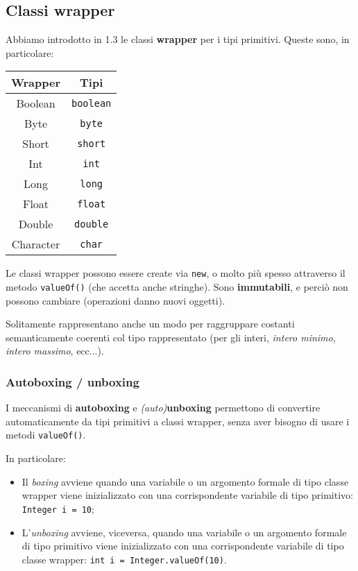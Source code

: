 \documentclass[a4paper,11pt]{article}
\begin{document}
\subsection{Classi wrapper}
Abbiamo introdotto in 1.3 le classi \textbf{wrapper} per i tipi primitivi.
Queste sono, in particolare:
\begin{table}[H]
	\center {}
	\begin{tabular} { c | c }
		\bfseries Wrapper & \bfseries Tipi \\
		\hline
		Boolean & \lstinline|boolean|\\
		Byte & \lstinline|byte|\\
		Short & \lstinline|short|\\
		Int & \lstinline|int|\\
		Long & \lstinline|long|\\
		Float & \lstinline|float|\\
		Double & \lstinline|double|\\
		Character & \lstinline|char|\\
	\end{tabular}
\end{table}

Le classi wrapper possono essere create via \lstinline|new|, o molto più spesso attraverso il metodo \lstinline|valueOf()| (che accetta anche stringhe).
Sono \textbf{immutabili}, e perciò non possono cambiare (operazioni danno nuovi oggetti).

Solitamente rappresentano anche un modo per raggruppare costanti semanticamente coerenti col tipo rappresentato (per gli interi, \textit{intero minimo}, \textit{intero massimo}, ecc...).

\subsubsection{Autoboxing / unboxing}
I meccanismi di \textbf{autoboxing} e \textit{(auto)}\textbf{unboxing} permettono di convertire automaticamente da tipi primitivi a classi wrapper, senza aver bisogno di usare i metodi \lstinline|valueOf()|.

In particolare:
\begin{itemize}
	\item Il \textit{boxing} avviene quando una variabile o un argomento formale di tipo classe wrapper viene inizializzato con una corrispondente variabile di tipo primitivo: \lstinline|Integer i = 10|;
	\item L'\textit{unboxing} avviene, viceversa, quando una variabile o un argomento formale di tipo primitivo viene inizializzato con una corrispondente variabile di tipo classe wrapper: \lstinline|int i = Integer.valueOf(10)|.
\end{itemize}
\end{document}
